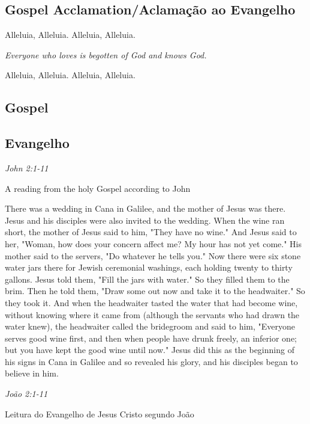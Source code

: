 \documentclass[10pt,a5]{article}
\newcommand \subsect[2] {\subsection*{#1} \switchcolumn \subsection*{#2} \switchcolumn*}
\begin{document}
\begin{center}

\subsection*{Gospel Acclamation/Aclama\c{c}\~ao ao Evangelho}

Alleluia, Alleluia. Alleluia, Alleluia.

\textit{Everyone who loves is begotten of God and knows God.}

Alleluia, Alleluia. Alleluia, Alleluia.

\end{center}

\begin{paracol}{2}

 \subsect{Gospel}{Evangelho}

 \textit{John 2:1-11}

\hspace{2em} A reading from the holy Gospel according to John 

There was a wedding in Cana in Galilee, and the mother of Jesus was there.
Jesus and his disciples were also invited to the wedding.
When the wine ran short, the mother of Jesus said to him, "They have no wine."
And Jesus said to her, "Woman, how does your concern affect me? My hour has not yet come."
His mother said to the servers, "Do whatever he tells you."
Now there were six stone water jars there for Jewish ceremonial washings, each holding twenty to thirty gallons.
Jesus told them, "Fill the jars with water." So they filled them to the brim.
Then he told them, "Draw some out now and take it to the headwaiter." So they took it.
And when the headwaiter tasted the water that had become wine, without knowing where it came from (although the servants who had drawn the water knew), the headwaiter called the bridegroom
and said to him, "Everyone serves good wine first, and then when people have drunk freely, an inferior one; but you have kept the good wine until now."
Jesus did this as the beginning of his signs in Cana in Galilee and so revealed his glory, and his disciples began to believe in him.\\



 \switchcolumn


 \textit{João 2:1-11}

 \hspace{2em} Leitura do Evangelho de Jesus Cristo segundo Jo\~ao


\end{paracol}
\end{document}
